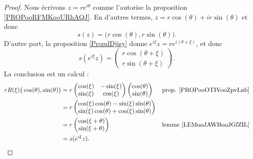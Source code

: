 \begin{proof}
	Nous écrivons \( z=r e^{i\theta}\) comme l'autorise la proposition \ref{PROPooRFMKooURhAQJ}. En d'autres termes, \( z=r\cos(\theta)+ir\sin(\theta)\) et donc
	\begin{equation}
		s(z)=\big( r\cos(\theta), r\sin(\theta) \big).
	\end{equation}
	D'autre part, la proposition \ref{PropdDjisy} donne \(  e^{i\xi}z=r e^{i(\theta+\xi)}\), et donc
	\begin{equation}
		s( e^{i\xi}z)=\begin{pmatrix}
			r\cos(\theta+\xi) \\
			r\sin(\theta+\xi)
		\end{pmatrix}.
	\end{equation}
	La conclusion est un calcul :
	\begin{subequations}
		\begin{align}
			rR(\xi)\big( \cos(\theta),\sin(\theta) \big) & =r\begin{pmatrix}
				                                                 \cos(\xi) & -\sin(\xi) \\
				                                                 \sin(\xi) & \cos(\xi)
			                                                 \end{pmatrix}\begin{pmatrix}
				                                                              \cos(\theta) \\
				                                                              \sin(\theta)
			                                                              \end{pmatrix}                   & \text{prop. \ref{PROPooOTIVooZpvLnb}} \\
			                                             & =r\begin{pmatrix}
				                                                 \cos(\xi)\cos(\theta)-\sin(\xi)\sin(\theta) \\
				                                                 \sin(\xi)\cos(\theta)+\cos(\xi)\sin(\theta)
			                                                 \end{pmatrix}                                          \\
			                                             & =r\begin{pmatrix}
				                                                 \cos(\xi+\theta) \\
				                                                 \sin(\xi+\theta)
			                                                 \end{pmatrix}                            & \text{lemme \ref{LEMooJAWBooJGfZIL}}      \\
			                                             & =s( e^{i\xi}z).
		\end{align}
	\end{subequations}
\end{proof}


